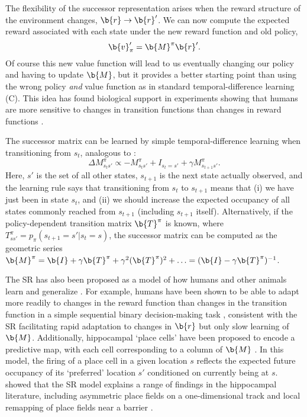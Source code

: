 The flexibility of the successor representation arises when the reward structure of the environment changes, $\b{r} \rightarrow \b{r}'$.
We can now compute the expected reward associated with each state under the new reward function and old policy,
\begin{equation}
    \b{v}_\pi' = \b{M}^\pi \b{r}'.
\end{equation}
Of course this new value function will lead to us eventually changing our policy and having to update $\b{M}$, but it provides a better starting point than using the wrong policy \emph{and} value function as in standard temporal-difference learning (C).
This idea has found biological support in experiments showing that humans are more sensitive to changes in transition functions than changes in reward functions \citep{momennejad2017successor}.

The successor matrix can be learned by simple temporal-difference learning when transitioning from $s_t$, analogous to :
\begin{equation}
    \Delta M^\pi_{s_t s'} \propto -M^\pi_{s_t s'} + I_{s_t = s'} + \gamma M^\pi_{s_{t+1} s'}.
\end{equation}
Here, ${s'}$ is the set of all other states, $s_{t+1}$ is the next state actually observed, and the learning rule says that transitioning from $s_t$ to $s_{t+1}$ means that (i) we have just been in state $s_t$, and (ii) we should increase the expected occupancy of all states commonly reached from $s_{t+1}$ (including $s_{t+1}$ itself).
Alternatively, if the policy-dependent transition matrix $\b{T}^\pi$ is known, where $T^\pi_{s s'} = p_{\pi}(s_{t+1} = s' | s_t = s)$, the successor matrix can be computed as the geometric series $\b{M}^\pi = \b{I} + \gamma \b{T}^\pi + \gamma^2 (\b{T}^\pi)^2 + \ldots = (\b{I} - \gamma \b{T}^\pi)^{-1}$.

The SR has also been proposed as a model of how humans and other animals learn and generalize \citep{momennejad2017successor, stachenfeld2017hippocampus, geerts2020general,gershman2018successor}.
For example, humans have been shown to be able to adapt more readily to changes in the reward function than changes in the transition function in a simple sequential binary decision-making task \citep{momennejad2017successor}, consistent with the SR facilitating rapid adaptation to changes in $\b{r}$ but only slow learning of $\b{M}$.
Additionally, hippocampal `place cells' have been proposed to encode a predictive map, with each cell corresponding to a column of $\b{M}$ \citep{stachenfeld2017hippocampus}.
In this model, the firing of a place cell in a given location $s$ reflects the expected future occupancy of its `preferred' location $s'$ conditioned on currently being at $s$.
\citet{stachenfeld2017hippocampus} showed that the SR model explains a range of findings in the hippocampal literature, including asymmetric place fields on a one-dimensional track \citep{mehta2000experience} and local remapping of place fields near a barrier \citep{alvernhe2011local}.

